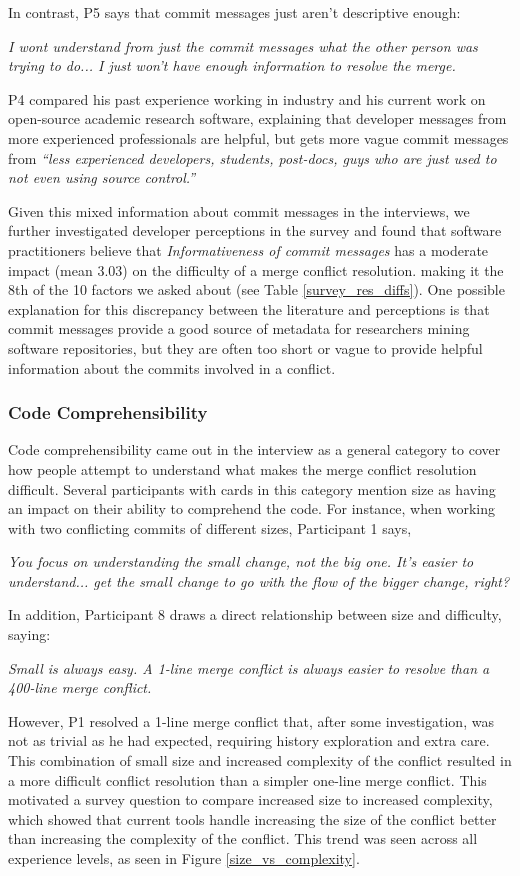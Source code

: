 In contrast, P5 says that commit messages just aren't descriptive enough:
\begin{displayquote}
\textit{I wont understand from just the commit messages what the other person was trying to do... I just won't have enough information to resolve the merge.}
\end{displayquote}

P4 compared his past experience working in industry and his current work on open-source academic research software, explaining that developer messages from more experienced professionals are helpful, but gets more vague commit messages from \textit{``less experienced developers, students, post-docs, guys who are just used to not even using source control.''}

Given this mixed information about commit messages in the interviews, we further investigated developer perceptions in the survey and found that software practitioners believe that \textit{Informativeness of commit messages} has a moderate impact (mean 3.03) on the difficulty of a merge conflict resolution. making it the 8th  of the 10 factors we asked about (see Table \ref{survey_res_diffs}). One possible explanation for this discrepancy between the literature and perceptions is that commit messages provide a good source of metadata for researchers mining software repositories, but they are often too short or vague to provide helpful information about the commits involved in a conflict.
\subsubsection{Code Comprehensibility}
Code comprehensibility came out in the interview as a general category to cover how people attempt to understand what makes the merge conflict resolution difficult. Several participants with cards in this category mention size as having an impact on their ability to comprehend the code. For instance, when working with two conflicting commits of different sizes, Participant 1 says,
\begin{displayquote}
\textit{You focus on understanding the small change, not the big one. It's easier to understand... get the small change to go with the flow of the bigger change, right?}
\end{displayquote}	
In addition, Participant 8 draws a direct relationship between size and difficulty, saying:
\begin{displayquote}
\textit{Small is always easy. A 1-line merge conflict is always easier to resolve than a 400-line merge conflict.}
\end{displayquote}
However, P1 resolved a 1-line merge conflict that, after some investigation, was not as trivial as he had expected, requiring history exploration and extra care. This combination of small size and increased complexity of the conflict resulted in a more difficult conflict resolution than a simpler one-line merge conflict.
This motivated a survey question to compare increased size to increased complexity, which showed that current tools handle increasing the size of the conflict better than increasing the complexity of the conflict. This trend was seen across all experience levels, as seen in Figure \ref{size_vs_complexity}.

